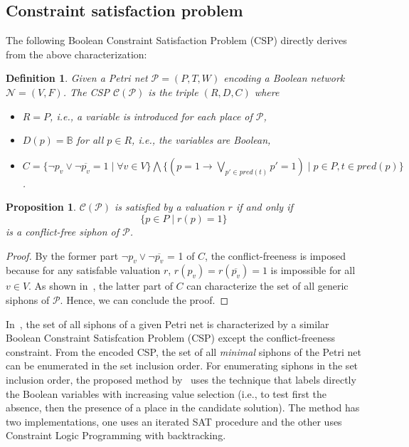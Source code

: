 \documentclass[preprint,12pt]{elsarticle}
\newtheorem{definition}{Definition}[section]
\newtheorem{proposition}{Proposition}[section]
\begin{document}
\subsection{Constraint satisfaction problem}
\label{subsec:computation_csp}

The following Boolean Constraint Satisfaction Problem (CSP) directly derives from the above characterization:
\begin{definition}

  Given a Petri net \(\mathcal{P} = (P, T, W)\) encoding a Boolean network \(\mathcal{N} = (V, F)\).
  The CSP \(\mathcal{C}(\mathcal{P})\) is the triple \((R, D, C)\) where
  \begin{itemize}%
    \item \(R = P\), i.e., a variable is introduced for each place of \(\mathcal{P}\),
    \item \(D(p) = \mathbb{B}\) for all \(p \in R\), i.e., the variables are Boolean,
    \item \(C = \{\neg p_v \vee \neg \overline{p_v} = 1 \mid \forall v \in V\} \bigwedge
\{(p = 1 \rightarrow \bigvee_{p' \in pred(t)}p' = 1) \mid p \in P, t \in pred(p)\}\).
  \end{itemize}

\end{definition}

\begin{proposition}
\label{prop:csp_conflict_free_siphon}
  \(\mathcal{C}(\mathcal{P})\) is satisfied by a valuation \(r\) if and only if
  \[
    \{p \in P \;|\; r(p) = 1\}\
  \]
  is a conflict-free siphon of \(\mathcal{P}\).

\end{proposition}

\begin{proof}

  By the former part \(\neg p_v \vee \neg \overline{p_v}\) = 1 of \(C\), the conflict-freeness is imposed because for any satisfable valuation \(r\), \(r(p_v) = r(\overline{p_v}) = 1\) is impossible for all \(v \in V\).
  As shown in~\cite{nabli2016enumerating}, the latter part of \(C\) can characterize the set of all generic siphons of \(\mathcal{P}\).
  Hence, we can conclude the proof.
  
\end{proof}

In~\cite{nabli2016enumerating}, the set of all siphons of a given Petri net is characterized by a similar Boolean Constraint Satisfcation Problem (CSP) except the conflict-freeness constraint.
From the encoded CSP, the set of all \emph{minimal} siphons of the Petri net can be enumerated in the set inclusion order.
For enumerating siphons in the set inclusion order, the proposed method by~\cite{nabli2016enumerating} uses the technique that labels directly the Boolean variables with increasing value selection (i.e., to test first the absence, then the presence of a place in the candidate solution).
The method has two implementations, one uses an iterated SAT procedure and the other uses Constraint Logic Programming with backtracking.
\end{document}
